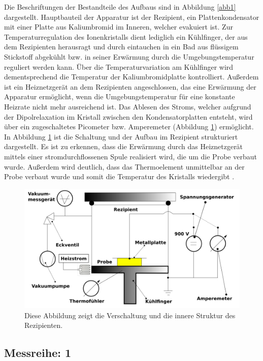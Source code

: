 Die Beschriftungen der Bestandteile des Aufbaus sind in Abbildung \ref{abb1} dargestellt.
Hauptbauteil der Apparatur ist der Rezipient, ein Plattenkondensator mit einer Platte aus 
Kaliumbromid
im Inneren, welcher evakuiert ist. 
Zur Temperaturregulation des Ionenkristalls dient lediglich ein Kühlfinger, 
der aus dem Rezipienten herausragt und durch eintauchen in ein Bad aus flüssigem 
Stickstoff abgekühlt bzw. in seiner Erwärmung durch die Umgebungstemperatur reguliert 
werden kann. Über die Temperaturvariation am Kühlfinger wird dementsprechend die 
Temperatur der Kaliumbromidplatte kontrolliert. 
Außerdem ist ein Heiznetzgerät an dem Rezipienten angeschlossen, das eine Erwärmung 
der Apparatur ermöglicht, wenn die Umgebungstemperatur für eine konstante 
Heizrate nicht mehr ausreichend ist. 
Das Ablesen des Stroms, welcher aufgrund der Dipolrelaxation im Kristall zwischen 
den Kondensatorplatten entsteht, wird über ein zugeschaltetes Picometer 
bzw. Amperemeter (Abbildung \ref{abb2}) ermöglicht.
In Abbildung \ref{abb2} ist die Schaltung und der Aufbau im Rezipient strukturiert 
dargestellt. Es ist zu erkennen, dass die Erwärmung durch das Heiznetzgerät 
mittels einer stromdurchflossenen Spule realisiert wird, die um die Probe
verbaut wurde. Außerdem wird deutlich, dass das Thermoelement unmittelbar an 
der Probe verbaut wurde und somit die Temperatur des Kristalls wiedergibt \cite{sample}. 

\begin{figure}
    \centering
    \includegraphics[width=\textwidth, keepaspectratio]{figure/AufbauSkizze.png}
    \caption{Diese Abbildung zeigt die Verschaltung und die innere Struktur 
    des Rezipienten. 
    \cite{sample}}
    \label{abb2}
\end{figure}
\newpage

\subsection{Messreihe: 1}

